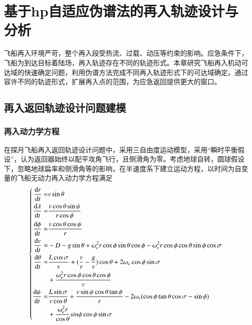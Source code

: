 \chapter{基于hp自适应伪谱法的再入轨迹设计与分析}

飞船再入环境严苛，整个再入段受热流、过载、动压等约束的影响。应急条件下，飞船为到达目标着陆场，再入轨迹存在不同的轨迹形式。本章研究飞船再入机动可达域的快速确定问题，利用伪谱方法完成不同再入轨迹形式下的可达域确定。通过容许不同的轨迹形式，扩展再入点的范围，为应急返回提供更大的窗口。

\section{再入返回轨迹设计问题建模}
\subsection{再入动力学方程}
在探月飞船再入返回轨迹设计问题中，采用三自由度运动模型，采用“瞬时平衡假设”，认为返回器始终以配平攻角飞行，且侧滑角为零。考虑地球自转，圆球假设下，忽略地球扁率和侧滑角等的影响，在半速度系下建立运动方程，以时间为自变量的飞船无动力再入动力学方程满足
\begin{equation}
	\left\{
	\begin{aligned}
		\frac{\dif r}{\dif t}=       & v \sin \theta                                                           \\
		\frac{\dif \lambda}{\dif t}= & \frac{v \cos \theta \sin \psi}
		{r \cos \phi}                                                                                          \\
		\frac{\dif \phi}{\dif t}=    & \frac{v \cos \theta \cos \psi}{r}                                       \\
		\frac{\dif v}{\dif t}=       & -D-g \sin \theta +\omega_e^2r\cos\phi \sin\theta \cos\phi-
		\omega_e^2r\cos\phi\cos\theta\sin\phi\cos\sigma                                                        \\
		\frac{\dif\theta}{\dif t} =  & \frac{L\cos\sigma}{v}+(\frac{v}{r}-
		\frac{g}{v})\cos\theta+2\omega_e\cos\phi\sin\sigma                                                     \\
		                             & {}+\frac{\omega_e^2r\cos\phi\cos\theta\cos\phi}{v}                      \\
		\frac{\dif\psi}{\dif t} =    & \frac{L\sin\sigma}{v\cos\theta}+\frac{v\sin \psi\cos \theta\tan\phi}{r}
		-2\omega_e(\cos\phi\tan\theta\cos\sigma-\sin\phi)                                                      \\
		                             & {}+\frac{\omega_e^2r}{\cos\theta}sin\phi\cos\phi\sin\sigma
	\end{aligned}
	\right.
\end{equation}
